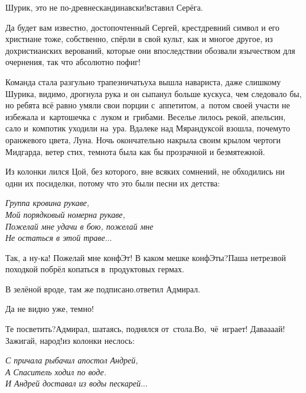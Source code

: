 \diagdash Шурик, это не по-древнескандинавски!\mdash вставил Серёга.

\diagdash Да будет вам известно, достопочтенный Сергей, крест\mdash древний символ и его христиане тоже, собственно, спёрли в свой культ, как и многое другое, из дохристианских верований, которые они впоследствии обозвали язычеством для очернения, так что абсолютно пофиг!

Команда стала разгульно трапезничать\mdash уха вышла навариста, даже слишком\mdash у Шурика, видимо, дрогнула рука и он сыпанул больше кус\sdash куса, чем следовало бы, но ребята всё равно умяли свои порции с~аппетитом, а~потом своей участи не избежала и~картошечка с~луком и~грибами. Веселье лилось рекой, апельсин, сало и~компотик уходили на~ура. Вдалеке над Мярандуксой взошла, почему\sdash то оранжевого цвета, Луна. Ночь окончательно накрыла своим крылом чертоги Мидгарда, ветер стих, темнота была как бы прозрачной и безмятежной.

Из колонки лился Цой, без которого, вне всяких сомнений, не обходились ни одни их посиделки, потому что это были песни их детства:

\vspace{0.2cm}
\noindent\textit{%
	\hspace*{2.0cm}Группа крови\mdash на рукаве,\\	
	\hspace*{2.0cm}Мой порядковый номер\mdash на рукаве,\\	
	\hspace*{2.0cm}Пожелай мне удачи в бою, пожелай мне\\
	\hspace*{2.0cm}Не остаться в этой траве$\ldots$
}
\vspace{0.2cm}

\diagdash Так, а ну-ка! Пожелай мне конфЭт! В каком мешке конфЭты?\mdash Паша нетрезвой походкой побрёл копаться в~продуктовых гермах.

\diagdash В зелёной вроде, там же подписано.\mdash ответил Адмирал.

\diagdash Да не видно уже, темно!

\diagdash Те посветить?\mdash Адмирал, шатаясь, поднялся от~стола.\mdash Во,~чё~играет! Дава\sdash а\sdash а\sdash ай! Зажигай, народ!\mdash из колонки неслось:

\vspace{0.2cm}
\noindent\textit{%
	\hspace*{2.5cm}С причала рыбачил апостол Андрей,\\	
	\hspace*{2.5cm}А Спаситель ходил по воде.\\
	\hspace*{2.5cm}И Андрей доставал из воды пескарей$\ldots$	
}
\vspace{0.2cm}

